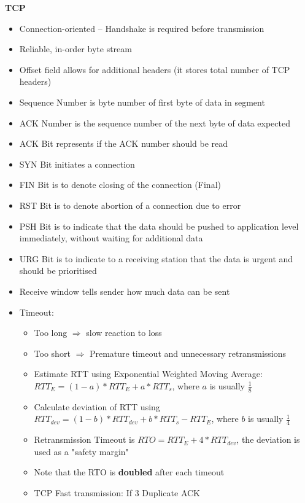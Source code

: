 \documentclass[a4paper]{article} \usepackage[backend=biber, style=numeric, sorting=none]{biblatex}
\begin{document}
\begin{multicols*}{4}
\textbf{TCP}
\begin{itemize}[leftmargin=*]
\item Connection-oriented -- Handshake is required before transmission
\item Reliable, in-order byte stream
\item Offset field allows for additional headers (it stores total number of TCP headers)
\item Sequence Number is byte number of first byte of data in segment
\item ACK Number is the sequence number of the next byte of data expected
\item ACK Bit represents if the ACK number should be read
\item SYN Bit initiates a connection
\item FIN Bit is to denote closing of the connection (Final)
\item RST Bit is to denote abortion of a connection due to error
\item PSH Bit is to indicate that the data should be pushed to application level immediately, without waiting for additional data
\item URG Bit is to indicate to a receiving station that the data is urgent and should be prioritised
\item Receive window tells sender how much data can be sent
\item Timeout:
  \begin{itemize}[leftmargin=*]
  \item Too long $\Rightarrow$ slow reaction to loss
  \item Too short $\Rightarrow$ Premature timeout and unnecessary retransmissions
  \item Estimate RTT using Exponential Weighted Moving Average: $RTT_E = (1 - a) * RTT_E + a * RTT_s$, where $a$ is usually $\frac{1}{8}$
  \item Calculate deviation of RTT using $RTT_{dev} = (1 - b) * RTT_{dev} + b*RTT_s - RTT_E$, where $b$ is usually $\frac{1}{4}$
  \item Retransmission Timeout is $RTO = RTT_{E} + 4 * RTT_{dev}$, the deviation is used as a "safety margin"
  \item Note that the RTO is \textbf{doubled} after each timeout
  \item TCP Fast transmission: If 3 Duplicate ACK
  \end{itemize}
\end{itemize}


\end{multicols*}
\end{document}
